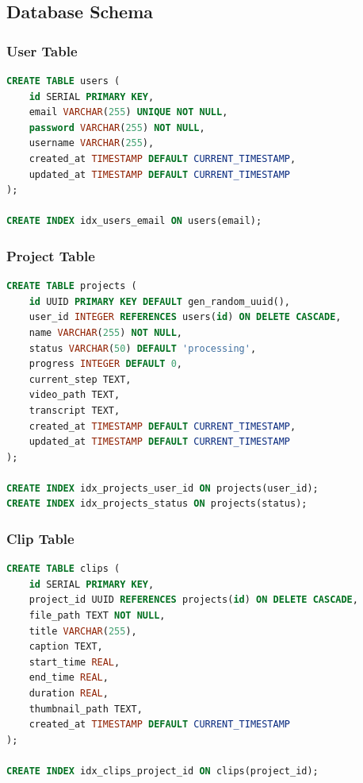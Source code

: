 \subsection{Database Schema}

\subsubsection{User Table}

\begin{lstlisting}[language=SQL, caption=User Table Schema]
CREATE TABLE users (
    id SERIAL PRIMARY KEY,
    email VARCHAR(255) UNIQUE NOT NULL,
    password VARCHAR(255) NOT NULL,
    username VARCHAR(255),
    created_at TIMESTAMP DEFAULT CURRENT_TIMESTAMP,
    updated_at TIMESTAMP DEFAULT CURRENT_TIMESTAMP
);

CREATE INDEX idx_users_email ON users(email);
\end{lstlisting}

\subsubsection{Project Table}

\begin{lstlisting}[language=SQL, caption=Project Table Schema]
CREATE TABLE projects (
    id UUID PRIMARY KEY DEFAULT gen_random_uuid(),
    user_id INTEGER REFERENCES users(id) ON DELETE CASCADE,
    name VARCHAR(255) NOT NULL,
    status VARCHAR(50) DEFAULT 'processing',
    progress INTEGER DEFAULT 0,
    current_step TEXT,
    video_path TEXT,
    transcript TEXT,
    created_at TIMESTAMP DEFAULT CURRENT_TIMESTAMP,
    updated_at TIMESTAMP DEFAULT CURRENT_TIMESTAMP
);

CREATE INDEX idx_projects_user_id ON projects(user_id);
CREATE INDEX idx_projects_status ON projects(status);
\end{lstlisting}

\subsubsection{Clip Table}

\begin{lstlisting}[language=SQL, caption=Clip Table Schema]
CREATE TABLE clips (
    id SERIAL PRIMARY KEY,
    project_id UUID REFERENCES projects(id) ON DELETE CASCADE,
    file_path TEXT NOT NULL,
    title VARCHAR(255),
    caption TEXT,
    start_time REAL,
    end_time REAL,
    duration REAL,
    thumbnail_path TEXT,
    created_at TIMESTAMP DEFAULT CURRENT_TIMESTAMP
);

CREATE INDEX idx_clips_project_id ON clips(project_id);
\end{lstlisting}

